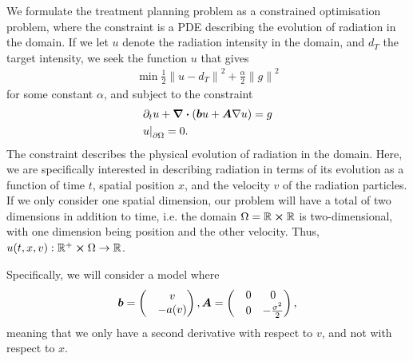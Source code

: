 \documentclass{article}  %
\begin{document}






We formulate the treatment planning problem as a constrained optimisation problem, where the constraint is a PDE describing the evolution of radiation in the domain. If we let $u$ denote the radiation intensity in the domain, and $d_T$ the target intensity, we seek the function $u$ that gives
%
\begin{align} 
    \label{eq:to-minimise}
    \min \frac{1}{2} {\lVert u - d_T \rVert}^2 + \frac{\alpha}{2} {\lVert g \rVert}^2
\end{align}
%
for some constant $\alpha$, and subject to the constraint
%
\begin{align}
    \label{eq:pde-constraint}
    &\partial_t u + \div{(\boldsymbol{b} u + \boldsymbol{A} \nabla u)} = g\\
    &{u \rvert}_{\partial \Omega} = 0.
\end{align}
%
The constraint describes the physical evolution of radiation in the domain. Here, we are specifically interested in describing radiation in terms of its evolution as a function of time $t$, spatial position $x$, and the velocity $v$ of the radiation particles. If we only consider one spatial dimension, our problem will have a total of two dimensions in addition to time, i.e. the domain $\Omega=\mathbb{R}\cross\mathbb{R}$ is two-dimensional, with one dimension being position and the other velocity. Thus, $u(t,x,v): \mathbb{R}^{+} \cross \Omega \rightarrow \mathbb{R}$.

Specifically, we will consider a model where
%
\begin{equation}
\boldsymbol{b} = 
\begin{pmatrix}
    &v\\
    &-a(v)
\end{pmatrix},
\boldsymbol{A} = 
\begin{pmatrix}
    &0 &0\\
    &0 &-\frac{\sigma^2}{2}
\end{pmatrix},
\end{equation}
%
meaning that we only have a second derivative with respect to $v$, and not with respect to $x$.
\end{document}
